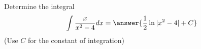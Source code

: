 \documentclass{ximera}
\author{Jason Miller}
\begin{document}
\begin{exercise}
Determine the integral
\[
\int \frac{x}{x^{2}-4} dx=\answer{ \frac{1}{2} \ln|x^{2}-4|+ C}
\]
(Use $C$ for the constant of integration)

\end{exercise}
\end{document}
